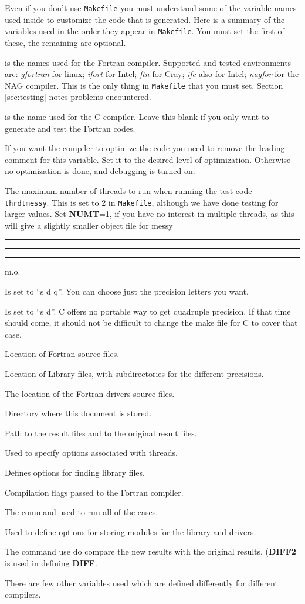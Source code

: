 \documentclass[12pt]{article}
\DeclareRobustCommand{\us}{\rule{.2pt}{0pt}\rule[-.8pt]{.4em}{.5pt}%
  \rule{.2pt}{0pt}}
\DeclareRobustCommand{\us}{\rule{.2pt}{0pt}\rule[-.8pt]{.4em}{.5pt}%
  \rule{.2pt}{0pt}}
\begin{document}
Even if you don't use {\tt Makefile} you must understand some of the variable
names used inside to customize the code that is generated.  Here is a summary of
the variables used in the order they appear in {\tt Makefile}.  You must set the
first of these, the remaining are optional.
\begin{description}\setlength{\itemsep}{-2pt}
\item[FC] is the names used for the Fortran compiler.  Supported and tested
  environments are: {\em gfortran} for linux; {\em ifort} for Intel; {\em ftn}
  for Cray; {\em ifc} also for Intel; {\em nagfor} for the NAG compiler.  This
  is the only thing in {\tt Makefile} that you must set. Section
  \ref{sec:testing} notes problems encountered.
\item[CC] is the name used for the C compiler.  Leave this blank if you only
  want to generate and test the Fortran codes.
\item[OPT] If you want the compiler to optimize the code you need to
  remove the leading comment for this variable.  Set it to the desired level of
  optimization.  Otherwise no optimization is done, and debugging is
  turned on.
\item[NUMT] The maximum number of threads to run when running the test code {\tt
    thrdtmessy}.  This is set to 2 in {\tt Makefile}, although we have done
  testing for larger values.  Set {\bf NUMT}=1, if you have no interest in
  multiple threads, as this will give a slightly smaller object file for
  messy\us m.o.
\item[PLETS] Is set to ``s d q''.  You can choose just the precision
  letters you want.
\item[CPLETS] Is set to ``s d''.  C  offers no portable way to get quadruple
  precision.  If that time should come, it should not be difficult to change the
  make file for C to cover that case.
\item[SRC] Location of Fortran source files.
\item[LIBS] Location of Library files, with subdirectories for
  the different precisions.
\item[DRV] The location of the Fortran drivers source files.
\item[DOC] Directory where this document is stored.
\item[R, RO] Path to the result files and to the original result files.
\item[T] Used to specify options associated with threads.
\item[LIB] Defines options for finding library files.
\item[FFLAGS] Compilation flags passed to the Fortran compiler.
\item[RUN] The command used to run all of the cases.
\item[J,JD] Used to define options for storing modules for the library and
  drivers.
\item[DIFF,DIFF2] The command use do compare the new results with the
  original results.  ({\bf DIFF2} is used in defining {\bf DIFF}.
\end{description}
There are few other variables used which are defined differently for different
compilers.
\end{document}
